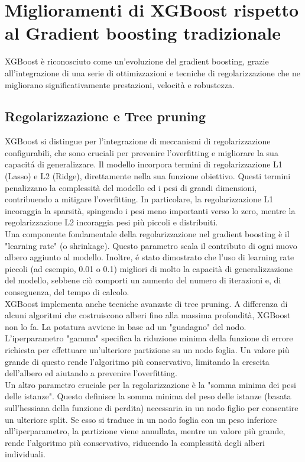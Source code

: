 \documentclass[a4paper,12pt]{report}
\begin{document}
	\section{Miglioramenti di XGBoost rispetto al Gradient boosting tradizionale}
	
	XGBoost è riconosciuto come un'evoluzione del gradient boosting, grazie all'integrazione di una serie di ottimizzazioni e tecniche di regolarizzazione che ne migliorano significativamente prestazioni, velocità e robustezza.
	
	\subsection{Regolarizzazione e Tree pruning}
	
	XGBoost si distingue per l'integrazione di meccanismi di regolarizzazione configurabili, che sono cruciali per prevenire l'overfitting e migliorare la sua capacitá di generalizzare.
	Il modello incorpora termini di regolarizzazione L1 (Lasso) e L2 (Ridge), direttamente nella sua funzione obiettivo. Questi termini penalizzano la complessità del modello ed i pesi di grandi dimensioni, contribuendo a mitigare l'overfitting. In particolare, la regolarizzazione L1 incoraggia la sparsità, spingendo i pesi meno importanti verso lo zero, mentre la regolarizzazione L2 incoraggia pesi più piccoli e distribuiti. \\
	Una componente fondamentale della regolarizzazione nel gradient boosting è il "learning rate" (o shrinkage). Questo parametro scala il contributo di ogni nuovo albero aggiunto al modello. Inoltre, é stato dimostrato che l'uso di learning rate piccoli (ad esempio, 0.01 o 0.1) migliori di molto la capacità di generalizzazione del modello, sebbene ciò comporti un aumento del numero di iterazioni e, di conseguenza, del tempo di calcolo. \\
	XGBoost implementa anche tecniche avanzate di tree pruning. A differenza di alcuni algoritmi che costruiscono alberi fino alla massima profondità, XGBoost non lo fa. La potatura avviene in base ad un "guadagno" del nodo. L'iperparametro "gamma" specifica la riduzione minima della funzione di errore richiesta per effettuare un'ulteriore partizione su un nodo foglia. Un valore più grande di questo rende l'algoritmo più conservativo, limitando la crescita dell'albero ed aiutando a prevenire l'overfitting. \\
	Un altro parametro cruciale per la regolarizzazione è la "somma minima dei pesi delle istanze". Questo definisce la somma minima del peso delle istanze (basata sull'hessiana della funzione di perdita) necessaria in un nodo figlio per consentire un ulteriore split. Se esso si traduce in un nodo foglia con un peso inferiore all'iperparametro, la partizione viene annullata, mentre un valore più grande, rende l'algoritmo più conservativo, riducendo la complessità degli alberi individuali. \\
\end{document}
